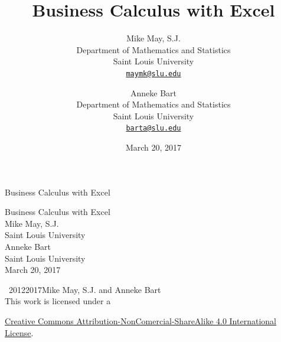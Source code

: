 \documentclass[10pt,]{book}
\title{Business Calculus with Excel}
\author{Mike May, S.J.\\
Department of Mathematics and Statistics\\
Saint Louis University\\
\href{mailto:maymk@slu.edu}{\nolinkurl{maymk@slu.edu}}
\and
Anneke Bart\\
Department of Mathematics and Statistics\\
Saint Louis University\\
\href{mailto:barta@slu.edu}{\nolinkurl{barta@slu.edu}}
}
\date{March 20, 2017}
\theoremstyle{plain}
\theoremstyle{definition}
\theoremstyle{definition}
\begin{document}
\frontmatter
\thispagestyle{empty}
{\centering
\vspace*{0.28\textheight}
{\Huge Business Calculus with Excel}\\}
\clearpage
\thispagestyle{empty}
\null%
\clearpage
\thispagestyle{empty}
{\centering
\vspace*{0.14\textheight}
{\Huge Business Calculus with Excel}\\[3\baselineskip]
{\Large Mike May, S.J.}\\[0.5\baselineskip]
{\Large Saint Louis University}\\[3\baselineskip]
{\Large Anneke Bart}\\[0.5\baselineskip]
{\Large Saint Louis University}\\[3\baselineskip]
{\Large March 20, 2017}\\}
\clearpage
\thispagestyle{empty}
\noindent\textcopyright\ 2012\textendash{}2017\quad{}Mike May, S.J. and Anneke Bart\\[0.5\baselineskip]

            
 

            This work is licensed under a 
          
            \href{http://creativecommons.org/licenses/by-nc-sa/4.0/}{Creative Commons Attribution-NonComercial-ShareAlike 4.0 International License}.\par\medskip
{}
\null\clearpage
\end{document}
